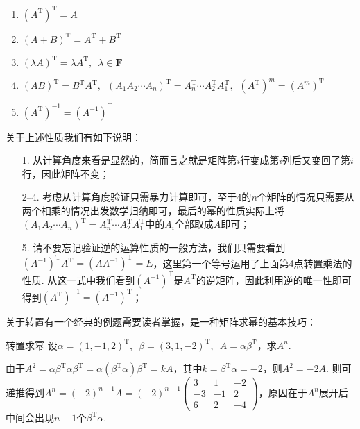 \begin{enumerate}
    \item $(A^\mathrm{T})^\mathrm{T}=A$

    \item $(A+B)^\mathrm{T}=A^\mathrm{T}+B^\mathrm{T}$

    \item $(\lambda A)^\mathrm{T}=\lambda A^\mathrm{T},\enspace \lambda \in \mathbf{F}$

    \item $(AB)^\mathrm{T}=B^\mathrm{T}A^\mathrm{T},\enspace(A_1A_2\cdots A_n)^\mathrm{T}=A_n^\mathrm{T}\cdots A_2^\mathrm{T}A_1^\mathrm{T},\enspace(A^\mathrm{T})^m=(A^m)^\mathrm{T}$

    \item $(A^\mathrm{T})^{-1}=(A^{-1})^\mathrm{T}$
\end{enumerate}
关于上述性质我们有如下说明：
\begin{itemize}
    \item[1.] 从计算角度来看是显然的，简而言之就是矩阵第$i$行变成第$i$列后又变回了第$i$行，因此矩阵不变；

    \item[2--4.] 考虑从计算角度验证只需暴力计算即可，至于4的$n$个矩阵的情况只需要从两个相乘的情况出发数学归纳即可，最后的幂的性质实际上将$(A_1A_2\cdots A_n)^\mathrm{T}=A_n^\mathrm{T}\cdots A_2^\mathrm{T}A_1^\mathrm{T}$中的$A_i$全部取成$A$即可；

    \item[5.] 请不要忘记验证逆的运算性质的一般方法，我们只需要看到$(A^{-1})^\mathrm{T}A^\mathrm{T}=(AA^{-1})^\mathrm{T}=E$，这里第一个等号运用了上面第4点转置乘法的性质. 从这一式中我们看到$(A^{-1})^\mathrm{T}$是$A^\mathrm{T}$的逆矩阵，因此利用逆的唯一性即可得到$(A^\mathrm{T})^{-1}=(A^{-1})^\mathrm{T}$；
\end{itemize}

关于转置有一个经典的例题需要读者掌握，是一种矩阵求幂的基本技巧：
\begin{example}{}{转置求幂}
    设$\alpha=(1,-1,2)^\mathrm{T},\enspace\beta=(3,1,-2)^\mathrm{T},\enspace A=\alpha\beta^\mathrm{T}$，求$A^n$.
\end{example}

\begin{solution}
    由于$A^2=\alpha\beta^\mathrm{T}\alpha\beta^\mathrm{T}=\alpha(\beta^\mathrm{T}\alpha)\beta^\mathrm{T}=kA$，其中$k=\beta^\mathrm{T}\alpha=-2$，则$A^2=-2A$. 则可递推得到$A^n=(-2)^{n-1}A=(-2)^{n-1}\begin{pmatrix}
            3 & 1 & -2 \\ -3 & -1 & 2 \\ 6 & 2 & -4
        \end{pmatrix}$，原因在于$A^n$展开后中间会出现$n-1$个$\beta^\mathrm{T}\alpha$.
\end{solution}

